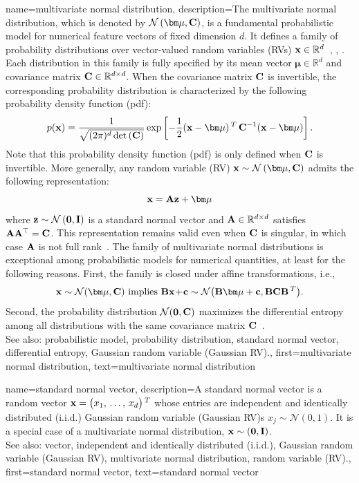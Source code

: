 {	
{name={multivariate normal distribution}, 
	description={The multivariate normal distribution, 
		which is denoted by $\mathcal{N}\left({\bm \mu},{\bf C}\right)$, is a fundamental 
		probabilistic model for numerical feature vectors of fixed dimension $d$. 
		It defines a family of probability distributions over vector-valued random variables (RVs) 
		${\bf x} \in \mathbb{R}^{d}$~\cite{BertsekasProb}, \cite{GrayProbBook}, \cite{Lapidoth09}. 
		Each distribution in this family is fully specified by its mean vector 
		${\bm \mu} \in \mathbb{R}^{d}$ and covariance matrix 
		${\bf C} \in \mathbb{R}^{d \times d}$. When the 
		covariance matrix ${\bf C}$ is invertible, the corresponding probability distribution is 
		characterized by the following probability density function (pdf):
		\[p({\bf x}) = 
 		\frac{1}{\sqrt{(2\pi)^{d} \det\,({\bf C})}} 
 		\exp\left[ -\frac{1}{2} 
 		({\bf x} - {\bm \mu})\,^{T}\, {\bf C}^{-1} 
 		({\bf x} - {\bm \mu}) \right].
 		\]
		Note that this probability density function (pdf) is only defined when ${\bf C}$ is invertible.
   		More generally, any random variable (RV) ${\bf x} \sim \mathcal{N}\left({\bm \mu},{\bf C}\right)$ 
   		admits the following representation:
  		\[
    		{\bf x} = {\bf A} {\bf z} + {\bm \mu}
   		\]
   		where ${\bf z} \sim \mathcal{N}\left(\mathbf{0},\mathbf{I}\right)$ is a standard normal vector 
   		and ${\bf A} \in \mathbb{R}^{d \times d}$ satisfies ${\bf A} {\bf A}^\top = {\bf C}$. 
   		This representation remains valid even when ${\bf C}$ is singular, in which case ${\bf A}$ 
   		is not full rank~\cite[Ch. 23]{Lapidoth2017}.
   		The family of multivariate normal distributions is exceptional among probabilistic models for numerical 
   		quantities, at least for the following reasons. First, the family is closed under affine 
   		transformations, i.e.,
		\[ 
		{\bf x} \sim \mathcal{N}({\bm \mu},{\bf C}) \mbox{ implies } 
		{\bf B}{\bf x}\!+\!{\bf c} \sim \mathcal{N}\big( {\bf B}{\bm \mu}+{\bf c},{\bf B} {\bf C} {\bf B}\,^{T} \big). 
		\]
		Second, the probability distribution $\mathcal{N}(\mathbf{0},{\bf C})$ maximizes the 
		differential entropy among all distributions with the same covariance matrix ${\bf C}$~\cite{coverthomas}. 
		\\ 
		See also: probabilistic model, probability distribution, standard normal vector, differential entropy, Gaussian random variable (Gaussian RV).}, 
	first={multivariate normal distribution},
	text={multivariate normal distribution}
}

{name={standard normal vector}, 
	description={A standard normal vector is a random 
		vector ${\bf x}=\big(x_{1}, \,\ldots, \,x_{d}\big)\,^{T}$ 
		whose entries are independent and identically distributed (i.i.d.) Gaussian random variable (Gaussian RV)s $x_{j} \sim \mathcal{N}(0,1)$. 
		It is a special case of a multivariate normal distribution, ${\bf x} \sim \mathcal(\mathbf{0},\mathbf{I})$.
		\\ 
		See also: vector, independent and identically distributed (i.i.d.), Gaussian random variable (Gaussian RV), multivariate normal distribution, random variable (RV).}, 
	first={standard normal vector},
	text={standard normal vector}
}

}
